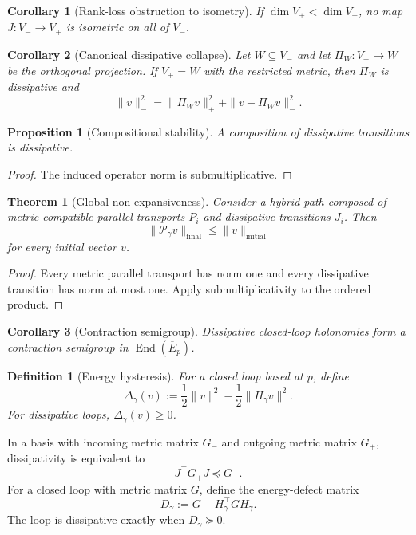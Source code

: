 \documentclass[11pt]{article}
\newtheorem{definition}{Definition}[section]
\newtheorem{theorem}{Theorem}[section]
\newtheorem{proposition}{Proposition}[section]
\newtheorem{corollary}{Corollary}[section]
\newcommand{\End}{\operatorname{End}}
\begin{document}
\begin{corollary}[Rank-loss obstruction to isometry]
If $\dim V_+<\dim V_-$, no map $J:V_-\to V_+$ is isometric on all of $V_-$.
\end{corollary}

\begin{corollary}[Canonical dissipative collapse]
Let $W\subseteq V_-$ and let $\Pi_W:V_-\to W$ be the orthogonal projection.
If $V_+=W$ with the restricted metric, then $\Pi_W$ is dissipative and
\[
\|v\|_-^2=\|\Pi_Wv\|_+^2+\|v-\Pi_Wv\|_-^2.
\]
\end{corollary}

\begin{proposition}[Compositional stability]
A composition of dissipative transitions is dissipative.
\end{proposition}

\begin{proof}
The induced operator norm is submultiplicative.
\end{proof}

\begin{theorem}[Global non-expansiveness]
Consider a hybrid path composed of metric-compatible parallel transports
$P_i$ and dissipative transitions $J_i$. Then
\[
\|\mathcal P_\gamma v\|_{\mathrm{final}}
\le\|v\|_{\mathrm{initial}}
\]
for every initial vector $v$.
\end{theorem}

\begin{proof}
Every metric parallel transport has norm one and every dissipative transition
has norm at most one. Apply submultiplicativity to the ordered product.
\end{proof}

\begin{corollary}[Contraction semigroup]
Dissipative closed-loop holonomies form a contraction semigroup in
$\End(\overline E_p)$.
\end{corollary}

\begin{definition}[Energy hysteresis]
For a closed loop based at $p$, define
\[
\Delta_\gamma(v)
:=\frac12\|v\|^2-\frac12\|H_\gamma v\|^2.
\]
For dissipative loops, $\Delta_\gamma(v)\ge0$.
\end{definition}

In a basis with incoming metric matrix $G_-$ and outgoing metric matrix $G_+$,
dissipativity is equivalent to
\[
J^\top G_+J\preceq G_-.
\]
For a closed loop with metric matrix $G$, define the energy-defect matrix
\[
D_\gamma:=G-H_\gamma^\top G H_\gamma.
\]
The loop is dissipative exactly when $D_\gamma\succeq0$.
\end{document}
